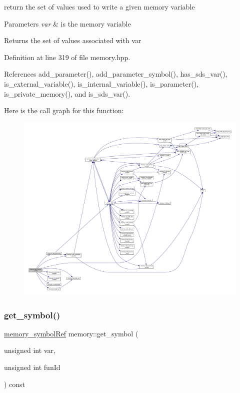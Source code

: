 return the set of values used to write a given memory variable 


\begin{DoxyParams}{Parameters}
{\em var} & is the memory variable \\
\hline
\end{DoxyParams}
\begin{DoxyReturn}{Returns}
the set of values associated with var 
\end{DoxyReturn}


Definition at line 319 of file memory.\+hpp.



References add\+\_\+parameter(), add\+\_\+parameter\+\_\+symbol(), has\+\_\+sds\+\_\+var(), is\+\_\+external\+\_\+variable(), is\+\_\+internal\+\_\+variable(), is\+\_\+parameter(), is\+\_\+private\+\_\+memory(), and is\+\_\+sds\+\_\+var().

Here is the call graph for this function\+:
\nopagebreak
\begin{figure}[H]
\begin{center}
\leavevmode
\includegraphics[width=350pt]{d8/d99/classmemory_a8a53cddf47d035cb68621156d6ce45c4_cgraph}
\end{center}
\end{figure}
\mbox{\label{classmemory_a380db560791ad488411a1d16c0526e43}} 
\subsubsection{\texorpdfstring{get\+\_\+symbol()}{get\_symbol()}}
{\footnotesize\ttfamily \hyperlink{memory__symbol_8hpp_af3608dbc27177447c2d777fa712cc82a}{memory\+\_\+symbol\+Ref} memory\+::get\+\_\+symbol (\begin{DoxyParamCaption}\item[{unsigned int}]{var,  }\item[{unsigned int}]{fun\+Id }\end{DoxyParamCaption}) const}



